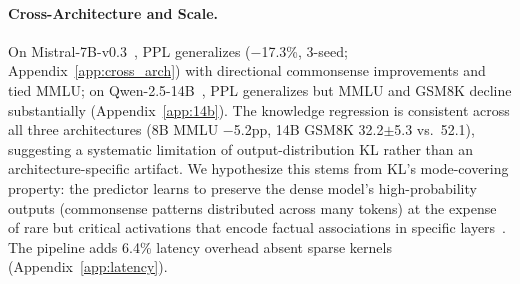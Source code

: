 \paragraph{Cross-Architecture and Scale.}
\label{sec:cross_arch}
On Mistral-7B-v0.3~\cite{jiang2023mistral}, PPL generalizes ($-$17.3\%, 3-seed; Appendix~\ref{app:cross_arch}) with directional commonsense improvements and tied MMLU; on Qwen-2.5-14B~\cite{qwen2024qwen25}, PPL generalizes but MMLU and GSM8K decline substantially (Appendix~\ref{app:14b}).
The knowledge regression is consistent across all three architectures (8B MMLU $-$5.2pp, 14B GSM8K 32.2$\pm$5.3 vs.\ 52.1), suggesting a systematic limitation of output-distribution KL rather than an architecture-specific artifact.
We hypothesize this stems from KL's mode-covering property: the predictor learns to preserve the dense model's high-probability outputs (commonsense patterns distributed across many tokens) at the expense of rare but critical activations that encode factual associations in specific layers~\cite{geva2023dissecting}.
The pipeline adds 6.4\% latency overhead absent sparse kernels (Appendix~\ref{app:latency}). %

